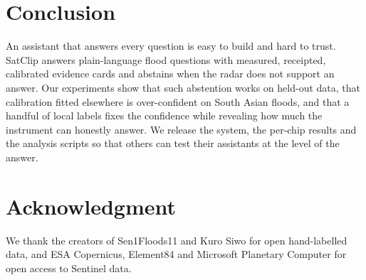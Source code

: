 \documentclass[conference]{IEEEtran}
\begin{document}
\section{Conclusion}

An assistant that answers every question is easy to build and hard to trust. SatClip answers plain-language flood questions with measured, receipted, calibrated evidence cards and abstains when the radar does not support an answer. Our experiments show that such abstention works on held-out data, that calibration fitted elsewhere is over-confident on South Asian floods, and that a handful of local labels fixes the confidence while revealing how much the instrument can honestly answer. We release the system, the per-chip results and the analysis scripts so that others can test their assistants at the level of the answer.

\section*{Acknowledgment}
We thank the creators of Sen1Floods11 and Kuro Siwo for open hand-labelled data, and ESA Copernicus, Element84 and Microsoft Planetary Computer for open access to Sentinel data.



\end{document}
